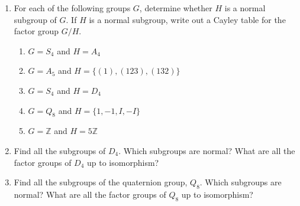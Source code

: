 {\small
 
 
\begin{enumerate}
 
 
\item
For each of the following groups $G$, determine whether $H$ is a normal
subgroup of $G$. If $H$ is a normal subgroup, write out a Cayley table
for the factor group $G/H$.
\begin{enumerate}
 
 \item
$G = S_4$ and $H = A_4$

 \item
$G = A_5$ and $H = \{ (1), (123), (132) \}$
 
 \item
$G = S_4$ and $H = D_4$
 
 \item
$G = Q_8$ and $H = \{ 1, -1, I, -I \}$
 
 \item
$G = {\mathbb Z}$ and $H = 5 {\mathbb Z}$
 
\end{enumerate}

 
 
\item
Find all the subgroups of $D_4$. Which subgroups are normal? What are
all the factor groups of $D_4$ up to isomorphism?
 
 
\item
Find all the subgroups of the quaternion group, $Q_8$. Which subgroups
are normal? What are all the factor groups of $Q_8$ up to isomorphism?
 
 
% 
 

\end{enumerate}}
